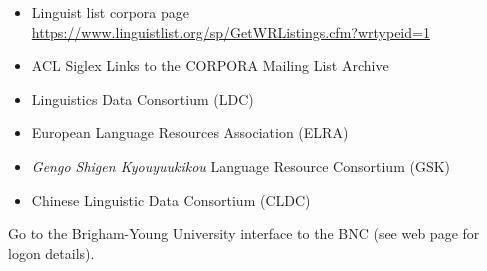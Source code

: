 \documentclass[a4paper,landscape,headrule,footrule,xetex]{foils}
\begin{document}

\begin{itemize}
\item Linguist list corpora page
\\ \url{https://www.linguistlist.org/sp/GetWRListings.cfm?wrtypeid=1}
\item ACL Siglex Links to the CORPORA Mailing List Archive
\item Linguistics Data Consortium (LDC)
\item European Language Resources Association (ELRA)
\item {} \textit{Gengo Shigen Kyouyuukikou} Language Resource Consortium (GSK)
\item {} Chinese Linguistic Data Consortium (CLDC)
\end{itemize}




Go to the Brigham-Young University interface to the BNC (see web page for logon details).
\end{document}
